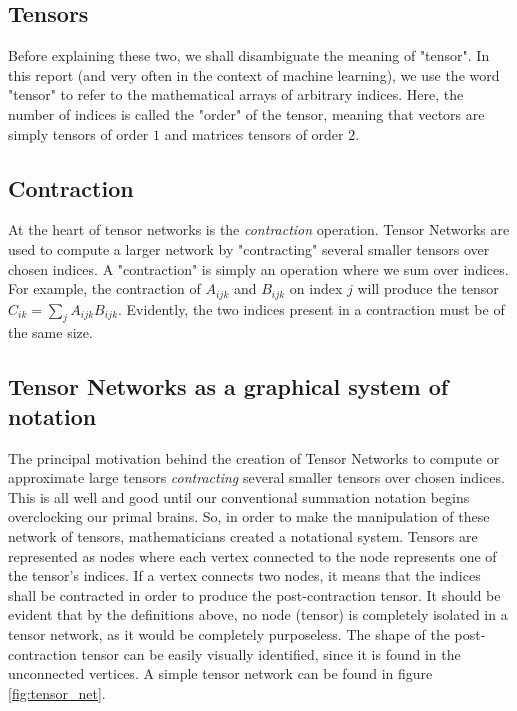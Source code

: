 \documentclass{article}
\theoremstyle{definition}
\theoremstyle{definition}
\begin{document}
\subsection{Tensors}
Before explaining these two, we shall disambiguate the meaning of "tensor". 
In this report (and very often in the context of machine learning), we use the word "tensor" to refer to the mathematical arrays of arbitrary indices. 
Here, the number of indices is called the "order" of the tensor, meaning that vectors are simply tensors of order $1$ and matrices tensors of order $2$. 

\subsection{Contraction}
At the heart of tensor networks is the {\it contraction} operation.
Tensor Networks are used to compute a larger network by "contracting" several
smaller tensors over chosen indices. A "contraction" is simply an operation 
where we sum over indices. For example, the contraction of $A_{ijk}$ and 
$B_{ijk}$ on index $j$ will produce the tensor $C_{ik} = \sum_{j} A_{ijk} B_{ijk}$.
Evidently, the two indices present in a contraction must be of the same size.

\subsection{Tensor Networks as a graphical system of notation}
The principal motivation behind the creation of Tensor Networks to compute or approximate large tensors {\it contracting} several smaller tensors over chosen indices. 
This is all well and good until our conventional summation notation begins overclocking our primal brains.
So, in order to make the manipulation of these network of tensors, mathematicians created a notational system. 
Tensors are represented as nodes where each vertex connected to the node represents one of the tensor's indices. 
If a vertex connects two nodes, it means that the indices shall be contracted in order to produce the post-contraction tensor. 
It should be evident that by the definitions above, no node (tensor) is completely isolated in a tensor network, as it would be completely purposeless. 
The shape of the post-contraction tensor can be easily visually identified, since it is found in the unconnected vertices.
A simple tensor network can be found in figure \ref{fig:tensor_net}.
\end{document}
